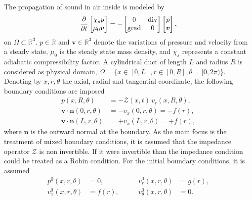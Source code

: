 \documentclass{ifacconf}
\begin{document}
The propagation of sound in air inside  is modeled by \cite{Trenchant}
\begin{equation}
\label{eq:gen_mod}
    \diffp{}{t}
    \begin{bmatrix}
    \chi_s p \\
    \mu_0 \bm{v} \\
    \end{bmatrix} = -
    \begin{bmatrix}
    0 & \mathrm{div} \\
    \mathrm{grad} & 0 \\
    \end{bmatrix}
    \begin{bmatrix}
    p \\
    \bm{v} \\
    \end{bmatrix},
\end{equation}
on $\Omega \subset \mathbb{R}^3$. $p \in \mathbb{R}$  and $\bm{v} \in \mathbb{R}^3$ denote the variations of pressure and velocity from a steady state, $\mu_0$ is the steady state mass density, and $\chi_s$ represents a constant adiabatic compressibility factor.  A cylindrical duct of length $L$ and radius $R$ is considered as physical domain, $\Omega = \{x \in [0, L], r \in [0, R], \theta = [0, 2 \pi)\}$. Denoting by $x, r, \theta$ the axial, radial and tangential coordinate,  the following boundary conditions are imposed
\begin{align}
    p(x, R, \theta) &= - \mathcal{Z}(x, t) \, v_r(x, R, \theta), \label{eq:bc_imp} \\
    \bm{v} \cdot \bm{n}(0, r, \theta) &= -v_x(0, r, \theta) = - f(r), \label{eq:bc_flowL}\\
    \bm{v} \cdot \bm{n}(L, r, \theta) &= +v_x(L, r, \theta) = + f(r), \label{eq:bc_flowR}
\end{align}
where $\bm{n}$ is the outward normal at the boundary. As the main focus is the treatment of mixed boundary conditions, it is assumed that the impedance operator $\mathcal{Z}$ is non invertible. If it were invertible than the impedance condition could be treated as a Robin condition. For the initial boundary conditions, it is assumed
\begin{equation}
\label{eq:init_con}
\begin{aligned}
    p^0(x, r, \theta) &= 0, \\
    v_x^0(x, r, \theta) &= f(r), 
\end{aligned}  \qquad
\begin{aligned}
    v_r^0(x, r, \theta) &= g(r), \\
    v_\theta^0(x, r, \theta) &= 0.
\end{aligned}    
\end{equation}
\end{document}
